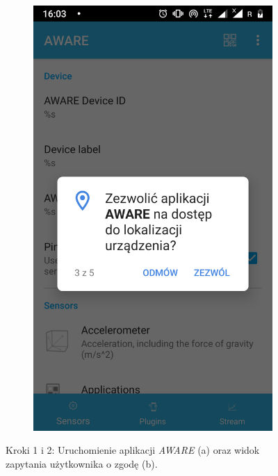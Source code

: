 \begin{enumerate}
\begin{figure}[H]
\begin{subfigure}{0.35\textwidth}
			\includegraphics[scale=0.13]{dodatekA/3_2.png}
			\subcaption{\label{subfigure_b}}
		\end{subfigure}
		\caption{ Kroki 1 i 2: Uruchomienie aplikacji \textit{AWARE} (a) oraz widok zapytania użytkownika o zgodę (b).}
	\end{figure}
	

\end{enumerate}
